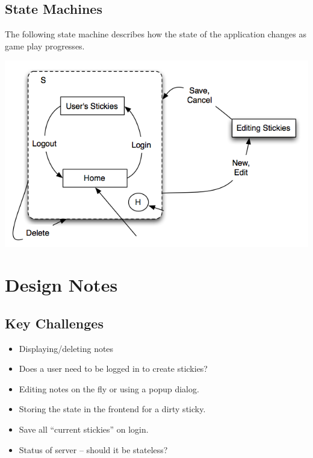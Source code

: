 \documentclass[11pt,letterpaper]{article}
\begin{document}
\subsection{State Machines}
The following state machine describes how the state of the application changes as game play progresses.
\begin{center}
\includegraphics[width=7in]{dot/statediagram.png}
\label{fig:sm1} 
\end{center}

\section{Design Notes}
\subsection{Key Challenges}
\begin{itemize}
\item Displaying/deleting notes\\

\item Does a user need to be logged in to create stickies?\\

\item Editing notes on the fly or using a popup dialog.\\

\item Storing the state in the frontend for a dirty sticky.\\

\item Save all ``current stickies'' on login.\\

\item Status of server -- should it be stateless?\\

\end{itemize}
\end{document}
